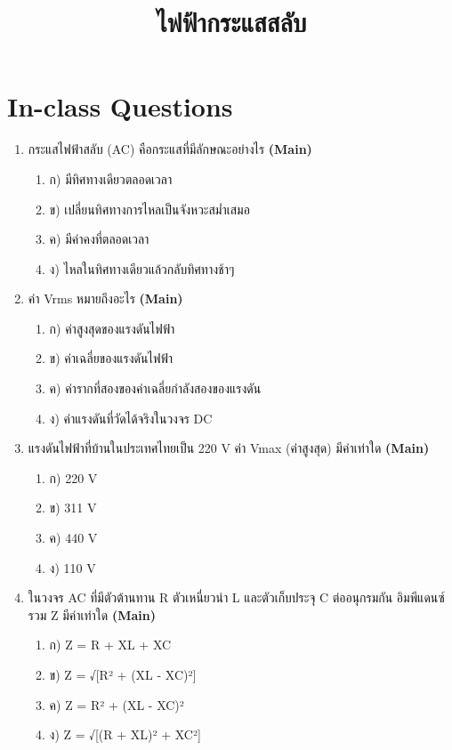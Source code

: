 \documentclass[12pt]{article}
\begin{document}
\title{ไฟฟ้ากระแสสลับ}
\maketitle
\section*{In-class Questions}
\begin{enumerate}[label=\arabic*.]
\item กระแสไฟฟ้าสลับ (AC) คือกระแสที่มีลักษณะอย่างไร \hfill \textbf{\small (Main)}
\begin{enumerate}[label=)]
\item ก) มีทิศทางเดียวตลอดเวลา
\item ข) เปลี่ยนทิศทางการไหลเป็นจังหวะสม่ำเสมอ
\item ค) มีค่าคงที่ตลอดเวลา
\item ง) ไหลในทิศทางเดียวแล้วกลับทิศทางช้าๆ
\end{enumerate}
\item ค่า Vrms หมายถึงอะไร \hfill \textbf{\small (Main)}
\begin{enumerate}[label=)]
\item ก) ค่าสูงสุดของแรงดันไฟฟ้า
\item ข) ค่าเฉลี่ยของแรงดันไฟฟ้า
\item ค) ค่ารากที่สองของค่าเฉลี่ยกำลังสองของแรงดัน
\item ง) ค่าแรงดันที่วัดได้จริงในวงจร DC
\end{enumerate}
\item แรงดันไฟฟ้าที่บ้านในประเทศไทยเป็น 220 V ค่า Vmax (ค่าสูงสุด) มีค่าเท่าใด \hfill \textbf{\small (Main)}
\begin{enumerate}[label=)]
\item ก) 220 V
\item ข) 311 V
\item ค) 440 V
\item ง) 110 V
\end{enumerate}
\item ในวงจร AC ที่มีตัวต้านทาน R ตัวเหนี่ยวนำ L และตัวเก็บประจุ C ต่ออนุกรมกัน อิมพีแดนซ์รวม Z มีค่าเท่าใด \hfill \textbf{\small (Main)}
\begin{enumerate}[label=)]
\item ก) Z = R + XL + XC
\item ข) Z = √[R² + (XL - XC)²]
\item ค) Z = R² + (XL - XC)²
\item ง) Z = √[(R + XL)² + XC²]
\end{enumerate}

\end{enumerate}
\end{document}
